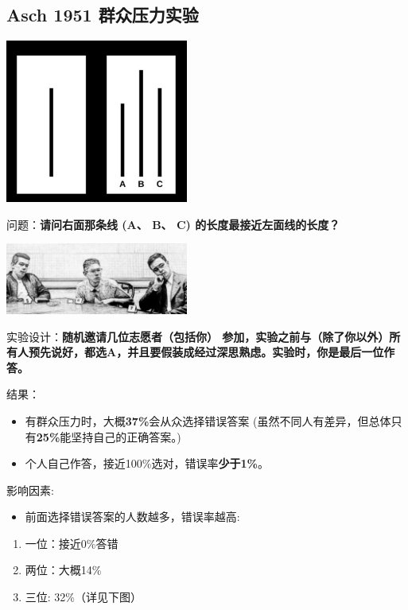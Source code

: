 \hypertarget{asch-1951-ux7fa4ux4f17ux538bux529bux5b9eux9a8c}{%
\subsection{Asch 1951
群众压力实验}\label{asch-1951-ux7fa4ux4f17ux538bux529bux5b9eux9a8c}}

\includegraphics[width=6cm]{Asch0Screenshot_2022-07-09_161023.jpg}

问题：\textbf{请问右面那条线 (A、 B、 C) 的长度最接近左面线的长度？}

\includegraphics[width=6cm]{Asch2Screenshot2.png}

实验设计：\textbf{随机邀请几位志愿者（包括你）
参加，实验之前与（除了你以外）所有人预先说好，都选A，并且要假装成经过深思熟虑。实验时，你是最后一位作答。}

结果：

\begin{itemize}
\tightlist
\item
  有群众压力时，大概\textbf{37\%}会从众选择错误答案
  (虽然不同人有差异，但总体只有\textbf{25\%}能坚持自己的正确答案。)
\item
  个人自己作答，接近100\%选对，错误率\textbf{少于1\%}。
\end{itemize}

影响因素:

\begin{itemize}
\tightlist
\item
  前面选择错误答案的人数越多，错误率越高:
\end{itemize}

\begin{enumerate}
\tightlist
\item
  一位：接近0\%答错
\item
  两位：大概14\%
\item
  三位: 32\%（详见下图）
\end{enumerate}

